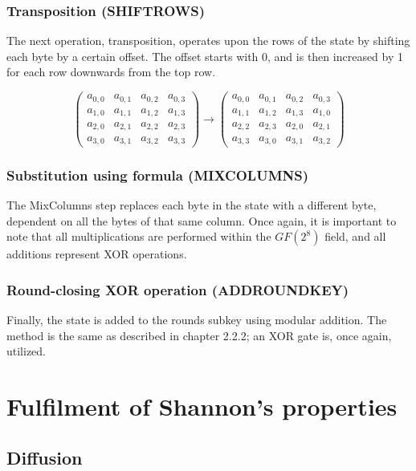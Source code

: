 \documentclass[12pt]{report}
\begin{document}
\subsubsection{Transposition (SHIFTROWS)}
The next operation, transposition, operates upon the rows of the state by shifting each byte by a certain offset. The offset starts with 0, and is then increased by 1 for each row downwards from the top row.

\[ \left( \begin{array}{cccc}
a_{0,0} & a_{0,1} & a_{0,2} & a_{0,3} \\
a_{1,0} & a_{1,1} & a_{1,2} & a_{1,3} \\
a_{2,0} & a_{2,1} & a_{2,2} & a_{2,3} \\
a_{3,0} & a_{3,1} & a_{3,2} & a_{3,3}\end{array} \right)
\to
\left( \begin{array}{cccc}
a_{0,0} & a_{0,1} & a_{0,2} & a_{0,3} \\
a_{1,1} & a_{1,2} & a_{1,3} & a_{1,0} \\
a_{2,2} & a_{2,3} & a_{2,0} & a_{2,1} \\
a_{3,3} & a_{3,0} & a_{3,1} & a_{3,2}\end{array} \right)
\] 

\subsubsection{Substitution using formula (MIXCOLUMNS)}
The MixColumns step replaces each byte in the state with a different byte, dependent on all the bytes of that same column. Once again, it is important to note that all multiplications are performed within the $GF(2^8)$ field, and all additions represent XOR operations.

\subsubsection{Round-closing XOR operation (ADDROUNDKEY)}
Finally, the state is added to the rounds subkey using modular addition. The method is the same as described in chapter 2.2.2; an XOR gate is, once again, utilized.

\section{Fulfilment of Shannon's properties}

\subsection{Diffusion}
\end{document}

